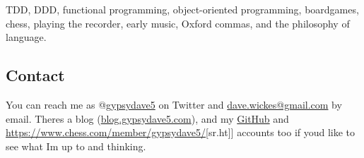 TDD, DDD, functional programming, object-oriented programming,
boardgames, chess, playing the recorder, early music, Oxford commas, and
the philosophy of language.

\hypertarget{contact}{%
\subsection{Contact}\label{contact}}

You can reach me as @\href{https://twitter.com/gypsydave5}{gypsydave5}
on Twitter and \href{mailto:dave@gypsydave5.com}{dave.wickes@gmail.com}
by email. There\textquotesingle s a blog
(\href{http://blog.gypsydave5.com/}{blog.gypsydave5.com}), and my
\href{https://github.com/gypsydave5}{GitHub} and
\url{https://www.chess.com/member/gypsydave5/}{[}sr.ht{]}{]} accounts
too if you\textquotesingle d like to see what I\textquotesingle m up to
and thinking.
